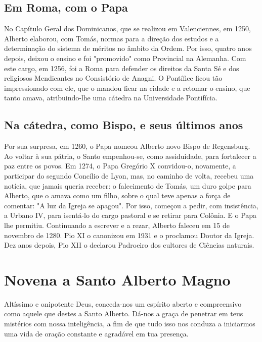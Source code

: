 \documentclass[a4paper,14pt,twoside]{extarticle} \usepackage[utf8]{inputenc}
\begin{document}
\subsection{Em Roma, com o Papa}

No Capítulo Geral dos Dominicanos, que se realizou em Valenciennes, em 1250, Alberto elaborou, com Tomás, normas para a direção dos estudos e a determinação do sistema de méritos no âmbito da Ordem. Por isso, quatro anos depois, deixou o ensino e foi "promovido" como Provincial na Alemanha.
Com este cargo, em 1256, foi a Roma para defender os direitos da Santa Sé e dos religiosos Mendicantes no Consistório de Anagni. O Pontífice ficou tão impressionado com ele, que o mandou ficar na cidade e a retomar o ensino, que tanto amava, atribuindo-lhe uma cátedra na Universidade Pontifícia.

\subsection{Na cátedra, como Bispo, e seus últimos anos}

Por sua surpresa, em 1260, o Papa nomeou Alberto novo Bispo de Regensburg. Ao voltar à sua pátria, o Santo empenhou-se, como assiduidade, para fortalecer a paz entre os povos.
Em 1274, o Papa Gregório X convidou-o, novamente, a participar do segundo Concílio de Lyon, mas, no caminho de volta, recebeu uma notícia, que jamais queria receber: o falecimento de Tomás, um duro golpe para Alberto, que o amava como um filho, sobre o qual teve apenas a força de comentar: "A luz da Igreja se apagou".
Por isso, começou a pedir, com insistência, a Urbano IV, para isentá-lo do cargo pastoral e se retirar para Colônia. E o Papa lhe permitiu.
Continuando a escrever e a rezar, Alberto faleceu em 15 de novembro de 1280. Pio XI o canonizou em 1931 e o proclamou Doutor da Igreja. Dez anos depois, Pio XII o declarou Padroeiro dos cultores de Ciências naturais.

\newpage

\section{Novena a Santo Alberto Magno}

Altíssimo e onipotente Deus, conceda-nos um espírito aberto e compreensivo como aquele que destes a Santo Alberto. Dá-nos a graça de penetrar em teus mistérios com nossa inteligência, a fim de que tudo isso nos conduza a iniciarmos uma vida de oração constante e agradável em tua presença. 
\end{document}
